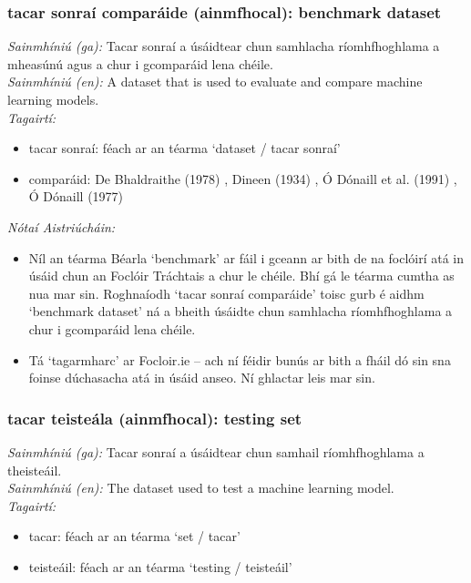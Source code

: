 \subsubsection*{tacar sonraí comparáide (ainmfhocal): benchmark dataset}
 \noindent \textit{Sainmhíniú (ga):} Tacar sonraí a úsáidtear chun samhlacha ríomhfhoghlama a mheasúnú agus a chur i gcomparáid lena chéile.
\\
 \noindent \textit{Sainmhíniú (en):} A dataset that is used to evaluate and compare machine learning models.
\\
 \noindent \textit{Tagairtí:}
\begin{itemize}
	\item tacar sonraí: féach ar an téarma `dataset / tacar sonraí'
	\item comparáid: De Bhaldraithe (1978) \cite{de-bhaldraithe}, Dineen (1934) \cite{dineen}, Ó Dónaill et al. (1991) \cite{focloir-beag}, Ó Dónaill (1977) \cite{odonaill}
\end{itemize}

 \noindent \textit{Nótaí Aistriúcháin:}
\begin{itemize}
	\item Níl an téarma Béarla `benchmark' ar fáil i gceann ar bith de na foclóirí atá in úsáid chun an Foclóir Tráchtais a chur le chéile. Bhí gá le téarma cumtha as nua mar sin. Roghnaíodh `tacar sonraí comparáide' toisc gurb é aidhm `benchmark dataset' ná a bheith úsáidte chun samhlacha ríomhfhoghlama a chur i gcomparáid lena chéile.
	\item Tá `tagarmharc' ar Focloir.ie -- ach ní féidir bunús ar bith a fháil dó sin sna foinse dúchasacha atá in úsáid anseo. Ní ghlactar leis mar sin.
\end{itemize}


\subsubsection*{tacar teisteála (ainmfhocal): testing set}
 \noindent \textit{Sainmhíniú (ga):} Tacar sonraí a úsáidtear chun samhail ríomhfhoghlama a theisteáil.
\\
 \noindent \textit{Sainmhíniú (en):} The dataset used to test a machine learning model.
\\
 \noindent \textit{Tagairtí:}
\begin{itemize}
	\item tacar: féach ar an téarma `set / tacar'
	\item teisteáil: féach ar an téarma `testing / teisteáil'
\end{itemize}

